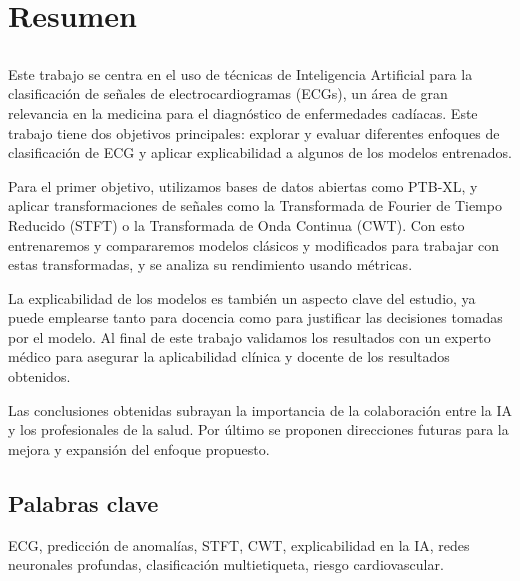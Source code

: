 \chapter*{Resumen}

\section*{\tituloPortadaVal}

Este trabajo se centra en el uso de técnicas de Inteligencia Artificial para la clasificación de señales de electrocardiogramas (ECGs), un área de gran relevancia en la medicina para el diagnóstico de enfermedades cadíacas. Este trabajo tiene dos objetivos principales: explorar y evaluar diferentes enfoques de clasificación de ECG y aplicar explicabilidad a algunos de los modelos entrenados.

Para el primer objetivo, utilizamos bases de datos abiertas como PTB-XL, y aplicar transformaciones de señales como la Transformada de Fourier de Tiempo Reducido (STFT) o la Transformada de Onda Continua (CWT). Con esto entrenaremos y compararemos modelos clásicos y modificados para trabajar con estas transformadas, y se analiza su rendimiento usando métricas.

La explicabilidad de los modelos es también un aspecto clave del estudio, ya puede emplearse tanto para docencia como para justificar las decisiones tomadas por el modelo. Al final de este trabajo validamos los resultados con un experto médico para asegurar la aplicabilidad clínica y docente de los resultados obtenidos.

Las conclusiones obtenidas subrayan la importancia de la colaboración entre la IA y los profesionales de la salud. Por último se proponen direcciones futuras para la mejora y expansión del enfoque propuesto.

\section*{Palabras clave}
   
ECG, predicción de anomalías, STFT, CWT, explicabilidad en la IA, redes neuronales profundas, clasificación multietiqueta, riesgo cardiovascular.
   



